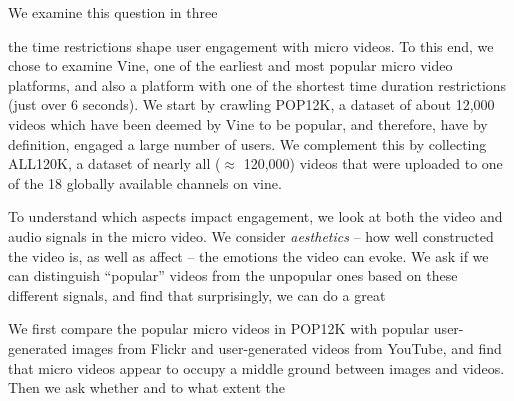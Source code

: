 We examine this question in three 

the time restrictions shape user engagement with micro videos. To this end, we chose to examine Vine, one of the earliest and most popular micro video platforms, and also a platform with one of the shortest time duration restrictions (just over 6 seconds). We start by crawling POP12K, a dataset of about 12,000 videos which have been deemed by Vine to be popular, and therefore, have by definition, engaged a large number of users. We complement this by collecting ALL120K, a dataset of nearly all ($\approx$ 120,000)  videos that were uploaded to one of the 18 globally available channels on vine.

To understand which aspects impact engagement, we look at both the video and audio signals in the micro video. We consider \emph{aesthetics} -- how well constructed the video is, as well as affect -- the emotions the video can evoke. We ask if we can distinguish ``popular'' videos from the unpopular ones based on these different signals, and find that surprisingly, we can do a great

We first compare the popular micro videos in POP12K with popular user-generated images from Flickr and user-generated videos from YouTube, and find that micro videos appear to occupy a middle ground between images and videos. Then we ask whether and to what extent the

%
%
%
